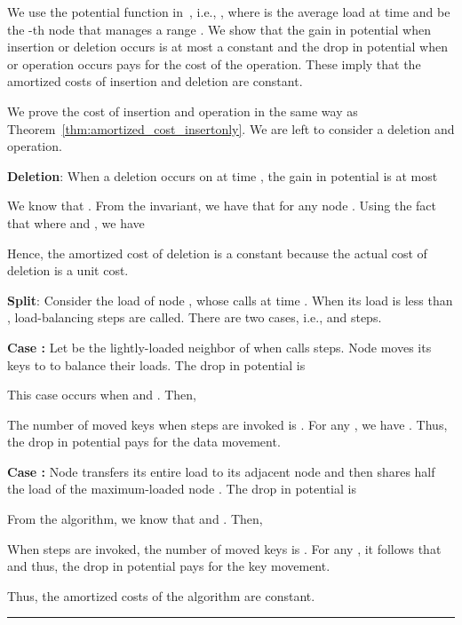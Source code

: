 \documentclass[a4paper]{article}
\newenvironment{proof}{{\bf Proof:}}{\hfill\rule{1.5mm}{3mm}\vspace{0.1in}}
\begin{document}
\begin{proof}
  We use the  potential function in~\cite{GanesanBGM04-vldb}, i.e., , where  is the
  average load at time  and  be the -th node that manages
  a range . We show that the gain in potential
  when insertion or deletion occurs is at most a constant and the drop
  in potential when {\minbalance} or {\split} operation occurs pays
  for the cost of the operation. These imply that the amortized costs
  of insertion and deletion are constant.

  We prove the cost of insertion and {\minbalance} operation in the
  same way as Theorem~\ref{thm:amortized_cost_insertonly}. We are left
  to consider a deletion and {\split} operation.

{\bf Deletion}: When a deletion occurs on  at time , the
gain in potential is at most



  We know that . From the invariant, we have that
   for any node .  Using the
  fact that  where  and
  , we have

  

  Hence, the amortized cost of deletion is a constant because the actual cost
  of deletion is a unit cost.

  {\bf Split}: Consider the load of node , whose calls {\split}
  at time . When its load is less than , 
  load-balancing steps are called.  There are two cases, i.e.,
  {\splitnbr} and {\splitmax} steps.

  {\bf Case {\splitnbr}:} Let  be the lightly-loaded neighbor of
   when  calls {\splitnbr} steps. Node  moves its keys
  to  to balance their loads.  The drop in potential is
    
  
  This case occurs when
   and . Then,
  

  The number of moved keys when {\splitnbr} steps are invoked is
  . For any , we have
  .  Thus,
  the drop in potential pays for the data movement.

  {\bf Case {\splitmax}:} Node  transfers its entire load to its
  adjacent node  and then shares half the load of the
  maximum-loaded node .  The drop in potential is

    

From the algorithm, we know that 
and . Then,


When {\splitmax} steps are invoked, the number of moved keys is
. For any
, it follows that  and thus, the drop in potential pays for the key movement.

Thus, the amortized costs of the algorithm are constant.
\end{proof}
\end{document}
